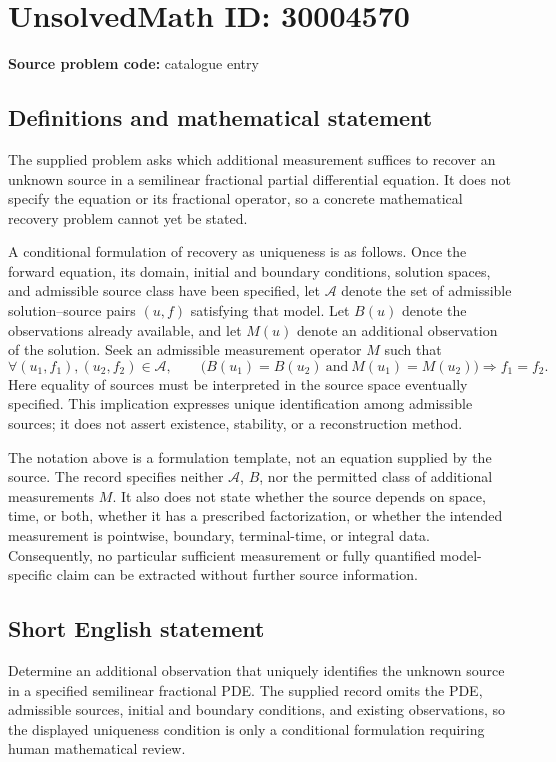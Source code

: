 \documentclass[11pt]{article}
\begin{document}
\section*{UnsolvedMath ID: 30004570}
\textbf{Source problem code:} catalogue entry
\subsection{Definitions and mathematical statement}
The supplied problem asks which additional measurement suffices to recover an unknown source in a semilinear fractional partial differential equation. It does not specify the equation or its fractional operator, so a concrete mathematical recovery problem cannot yet be stated.

A conditional formulation of recovery as uniqueness is as follows. Once the forward equation, its domain, initial and boundary conditions, solution spaces, and admissible source class have been specified, let \(\mathcal{A}\) denote the set of admissible solution--source pairs \((u,f)\) satisfying that model. Let \(B(u)\) denote the observations already available, and let \(M(u)\) denote an additional observation of the solution. Seek an admissible measurement operator \(M\) such that
\[
\forall (u_1,f_1),(u_2,f_2)\in\mathcal{A},\qquad
\bigl(B(u_1)=B(u_2)\ \text{and}\ M(u_1)=M(u_2)\bigr)
\Longrightarrow f_1=f_2.
\]
Here equality of sources must be interpreted in the source space eventually specified. This implication expresses unique identification among admissible sources; it does not assert existence, stability, or a reconstruction method.

The notation above is a formulation template, not an equation supplied by the source. The record specifies neither \(\mathcal{A}\), \(B\), nor the permitted class of additional measurements \(M\). It also does not state whether the source depends on space, time, or both, whether it has a prescribed factorization, or whether the intended measurement is pointwise, boundary, terminal-time, or integral data. Consequently, no particular sufficient measurement or fully quantified model-specific claim can be extracted without further source information.
\subsection{Short English statement}
Determine an additional observation that uniquely identifies the unknown source in a specified semilinear fractional PDE. The supplied record omits the PDE, admissible sources, initial and boundary conditions, and existing observations, so the displayed uniqueness condition is only a conditional formulation requiring human mathematical review.
\end{document}
